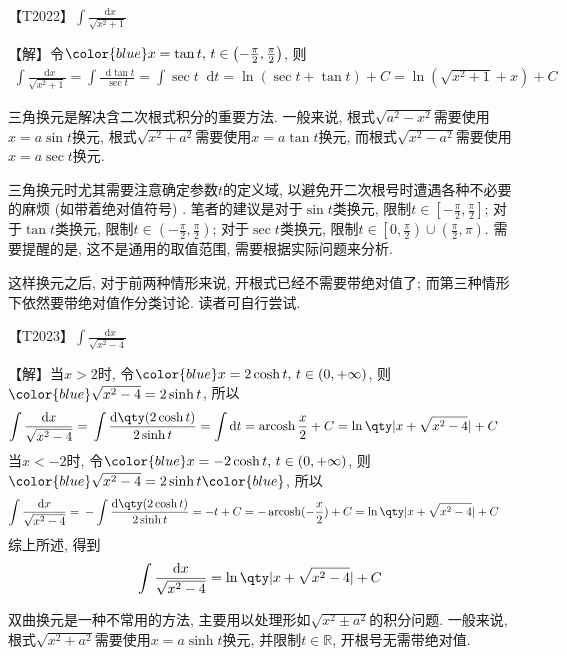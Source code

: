 \documentclass{ctexbook}
\DeclareMathOperator{\arcosh}{arcosh}
\newcommand*{\dif}{\mathop{}\!\mathrm{d}}
\begin{document}
{{\color{red}【T2022】}$\int\frac{\dif{x}}{\sqrt{x^{2}+1}}$\par
【解】令$\color{blue}x=\tan{t},\,t\in\left(-\frac{\pi}{2},\frac{\pi}{2}\right)$, 则
\begin{align*}
\int\frac{\dif{x}}{\sqrt{x^{2}+1}}=\int\frac{\dif{\tan{t}}}{\sec{t}}=\int\sec{t}\dif{t}=\ln(\sec{t}+\tan{t})+C=\ln(\sqrt{x^{2}+1}+x)+C
\end{align*}\par
{\kaishu 三角换元是解决含二次根式积分的重要方法. 一般来说, 根式$\sqrt{a^{2}-x^{2}}$需要使用$x=a\sin{t}$换元, 根式$\sqrt{x^{2}+a^{2}}$需要使用$x=a\tan{t}$换元, 而根式$\sqrt{x^{2}-a^{2}}$需要使用$x=a\sec{t}$换元. \par
三角换元时尤其需要注意确定参数$t$的定义域, 以避免开二次根号时遭遇各种不必要的麻烦 (如带着绝对值符号) . 笔者的建议是对于$\sin{t}$类换元, 限制$t\in\left[-\frac{\pi}{2},\frac{\pi}{2}\right]$; 对于$\tan{t}$类换元, 限制$t\in\left(-\frac{\pi}{2},\frac{\pi}{2}\right)$; 对于$\sec{t}$类换元, 限制$t\in\left[0,\frac{\pi}{2}\right)\cup\left(\frac{\pi}{2},\pi\right)$. 需要提醒的是, 这不是通用的取值范围, 需要根据实际问题来分析. \par
这样换元之后, 对于前两种情形来说, 开根式已经不需要带绝对值了; 而第三种情形下依然要带绝对值作分类讨论. 读者可自行尝试. \par}
{\color{red}【T2023】}$\int\frac{\dif{x}}{\sqrt{x^{2}-4}}$\par
【解】当$x>2$时, 令$\color{blue}x=2\cosh{t},\,t\in\left(0,+\infty\right)$, 则$\color{blue}\sqrt{x^{2}-4}=2\sinh{t}$, 所以
\begin{align*}
\int\frac{\dif{x}}{\sqrt{x^{2}-4}}={}&\int\frac{\dif{\qty(2\cosh{t})}}{2\sinh{t}}=\int\dif{t}=\arcosh{\frac{x}{2}}+C=\ln\qty|x+\sqrt{x^{2}-4}|+C
\end{align*}
当$x<-2$时, 令$\color{blue}x=-2\cosh{t},\,t\in\left(0,+\infty\right)$, 则$\color{blue}\sqrt{x^{2}-4}=2\sinh{t}\color{blue}$, 所以
\begin{align*}
\int\frac{\dif{x}}{\sqrt{x^{2}-4}}={}&-\int\frac{\dif{\qty(2\cosh{t})}}{2\sinh{t}}=-t+C=-\arcosh(-\frac{x}{2})+C=\ln\qty|x+\sqrt{x^{2}-4}|+C
\end{align*}
综上所述, 得到
\begin{align*}
\int\frac{\dif{x}}{\sqrt{x^{2}-4}}=\ln\qty|x+\sqrt{x^{2}-4}|+C
\end{align*}\par
{\kaishu 双曲换元是一种不常用的方法, 主要用以处理形如$\sqrt{x^{2}\pm a^{2}}$的积分问题. 一般来说, 根式$\sqrt{x^{2}+a^{2}}$需要使用$x=a\sinh{t}$换元, 并限制$t\in\mathbb{R}$, 开根号无需带绝对值. \par
}}
\end{document}
